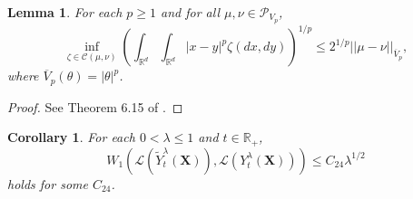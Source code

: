 \documentclass[a4paper,draft]{article}
\newtheorem{lemma}[theorem]{Lemma}
\newtheorem{corollary}[theorem]{Corollary}
\begin{document}
\begin{lemma}\label{ae} For each $p\geq 1$ and for all
$\mu,\nu\in\mathcal{P}_{V_p}$,
$$
\inf_{\zeta\in\mathcal{C}(\mu,\nu)}
\left(\int_{\mathbb{R}^d}\int_{\mathbb{R}^d} |x-y|^{p}\zeta(dx,dy)\right)^{1/p}
\leq 2^{1/p}||\mu-\nu||_{\overline{V}_{p}},$$
where $\overline{V}_p(\theta)=|\theta|^{p}$.
\end{lemma}
\begin{proof}
See Theorem 6.15 of \cite{villani}.
\end{proof}





\begin{corollary}\label{crux}
For each $0<\lambda\leq 1$ and $t\in\mathbb{R}_+$,
$$
W_1(\mathcal{L}(\tilde{Y}^{\lambda}_t(\mathbf{X})),
\mathcal{L}(Y^{\lambda}_t(\mathbf{X})))\leq
C_{24}\lambda^{1/2}
$$
holds for some $C_24$.
\end{corollary}
\end{document}
